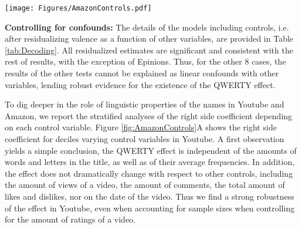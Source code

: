\documentclass[letterpaper]{sig-alternate-2013}
\begin{document}
\begin{figure*}[ht]
\texttt{[image: Figures/AmazonControls.pdf]}
\caption{Stratified analysis of the QWERTY effect in Youtube videos (A) and
Amazon products (B) controlling for linguistic measures (top) and contextual
properties (bottom). Each dot shows an estimate of the right side coefficient 
for each decile divided by the control variable. The right side coefficient 
is stable across all variables in Youtube. The right side coefficient in
Amazon  decreases for products with infrequent words and long names, and
disappears for products with very high sales.  \label{fig:AmazonControls}}
\end{figure*}


\textbf{Controlling for confounds:} The details of the models including
controls, i.e. after residualizing valence as a function of other variables,
are provided in Table \ref{tab:Decoding}. All residualized estimates are significant
and consistent with the rest of results, with the exception  of Epinions.
Thus, for the other 8 cases, the results of the other tests cannot be
explained as linear confounds with other variables, lending robust evidence
for the existence of the QWERTY effect.


To dig deeper in the role of linguistic properties of the names in  Youtube
and Amazon, we report the stratified analyses of the right side coefficient
 depending on each control variable.  Figure
\ref{fig:AmazonControls}A shows the right side coefficient  for
deciles varying control variables in Youtube.   A first observation yields a
simple conclusion, the QWERTY effect is independent of  the amounts of words
and letters in the title, as well as of their average frequencies. In
addition, the effect does not dramatically change with respect to other
controls, including the amount of views of a video, the amount of comments,
the total amount of likes and dislikes, nor on the date of the video. Thus we
find a strong robustness of the  effect in Youtube, even when accounting for
sample sizes when controlling for the amount of ratings of a video.
\end{document}
